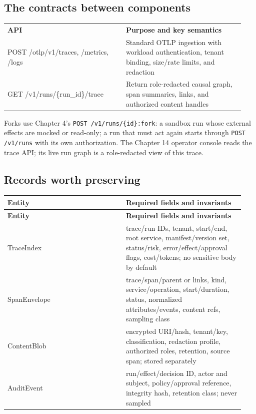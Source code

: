 \subsection{The contracts between components}

\BookTableStart
\small
\begin{tabular}{@{}Y{0.4700\linewidth}Y{0.4700\linewidth}@{}}
\color{white}\bfseries \textbf{API} & \color{white}\bfseries \textbf{Purpose and key semantics} \\
POST /otlp/v1/traces, /metrics, /logs & Standard OTLP ingestion with workload authentication, tenant binding, size/rate limits, and redaction \\
GET /v1/runs/\{run\_id\}/trace & Return role-redacted causal graph, span summaries, links, and authorized content handles \\
\end{tabular}
\BookTableEnd

Forks use Chapter 4's \lstinline[style=bookinline]!POST /v1/runs/{id}:fork!: a sandbox run whose external effects are mocked or read-only; a run that must act again starts through \lstinline[style=bookinline]!POST /v1/runs! with its own authorization. The Chapter 14 operator console reads the trace API; its live run graph is a role-redacted view of this trace.\par

\subsection{Records worth preserving}

\BookTableStart
\small
\begin{longtable}{@{}Y{0.4700\linewidth}Y{0.4700\linewidth}@{}}
\color{white}\bfseries \textbf{Entity} & \color{white}\bfseries \textbf{Required fields and invariants} \\
\endfirsthead
{}
\color{white}\bfseries \textbf{Entity} & \color{white}\bfseries \textbf{Required fields and invariants} \\
\endhead
TraceIndex & trace/run IDs, tenant, start/end, root service, manifest/version set, status/risk, error/effect/approval flags, cost/tokens; no sensitive body by default \\
SpanEnvelope & trace/span/parent or links, kind, service/operation, start/duration, status, normalized attributes/events, content refs, sampling class \\
ContentBlob & encrypted URI/hash, tenant/key, classification, redaction profile, authorized roles, retention, source span; stored separately \\
AuditEvent & run/effect/decision ID, actor and subject, policy/approval reference, integrity hash, retention class; never sampled \\
\end{longtable}
\BookTableEnd

